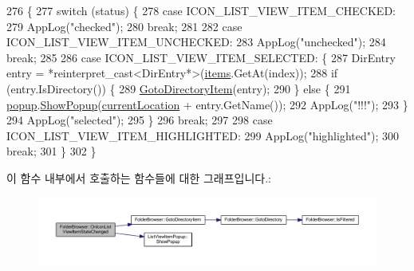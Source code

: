 \begin{DoxyCode}
276                                                       \{
277     \textcolor{keywordflow}{switch} (status) \{
278     \textcolor{keywordflow}{case} ICON\_LIST\_VIEW\_ITEM\_CHECKED:
279         AppLog(\textcolor{stringliteral}{"checked"});
280         \textcolor{keywordflow}{break};
281 
282     \textcolor{keywordflow}{case} ICON\_LIST\_VIEW\_ITEM\_UNCHECKED:
283         AppLog(\textcolor{stringliteral}{"unchecked"});
284         \textcolor{keywordflow}{break};
285 
286     \textcolor{keywordflow}{case} ICON\_LIST\_VIEW\_ITEM\_SELECTED: \{
287         DirEntry entry = *\textcolor{keyword}{reinterpret\_cast<}DirEntry*\textcolor{keyword}{>}(\hyperlink{class_folder_browser_ae88620740bd179b78a573f1db28c50ba}{items}.GetAt(index));
288         \textcolor{keywordflow}{if} (entry.IsDirectory()) \{
289             \hyperlink{class_folder_browser_ae5aef032f95d4d1ef70ed3bfdb74344a}{GotoDirectoryItem}(entry);
290         \} \textcolor{keywordflow}{else} \{
291             \hyperlink{class_folder_browser_a9715e8af0c63d75be7c1d65f3c4b47f8}{popup}.\hyperlink{class_list_view_item_popup_a6e5821dcd07b75edad9775650c8d5a63}{ShowPopup}(\hyperlink{class_folder_browser_a1f7bc249da2f28c6a03759a983eacf75}{currentLocation} + entry.GetName());
292             AppLog(\textcolor{stringliteral}{"!!!"});
293         \}
294         AppLog(\textcolor{stringliteral}{"selected"});
295     \}
296         \textcolor{keywordflow}{break};
297 
298     \textcolor{keywordflow}{case} ICON\_LIST\_VIEW\_ITEM\_HIGHLIGHTED:
299         AppLog(\textcolor{stringliteral}{"highlighted"});
300         \textcolor{keywordflow}{break};
301     \}
302 \}
\end{DoxyCode}


이 함수 내부에서 호출하는 함수들에 대한 그래프입니다.\+:
\nopagebreak
\begin{figure}[H]
\begin{center}
\leavevmode
\includegraphics[width=350pt]{class_folder_browser_acf642ba00f99bbb408a2ea6399eb768b_cgraph}
\end{center}
\end{figure}


